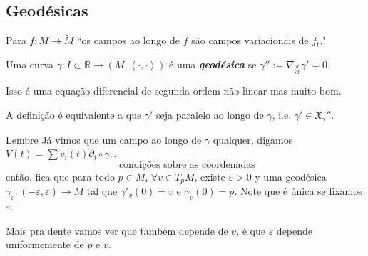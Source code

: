 \subsection{Geodésicas}


\begin{remark}\leavevmode
Para \(f:M \to \tilde{M}\) ``os campos ao longo de \(f\) são campos variacionais de \(f_t\)."
\end{remark}

\begin{defn}\leavevmode
Uma curva \(\gamma:I \subset \mathbb{R} \to (M, \left<\cdot,\cdot\right>)\) é uma \textit{\textbf{geodésica}} se \(\gamma'':=\nabla_{\frac{d}{dt}}\gamma'=0\).
\end{defn}

\begin{remark}\leavevmode
Isso é uma equação diferencial de segunda ordem não linear mas muito bom.
\end{remark}

\begin{remark}\leavevmode
A definição é equivalente a que \(\gamma'\) seja paralelo ao longo de \(\gamma\), i.e. \(\gamma' \in \mathfrak{X}_\gamma''\).
\end{remark}

\begin{thing7}{Lembre}\leavevmode
Já vimos que um campo ao longo de \(\gamma\) qualquer, digamos \(V(t)=\sum v_i(t)\partial_i \circ \gamma\)…
\[\text{ condições sobre as coordenadas} \]
então, fica que para todo \(p \in M\), \(\forall  v \in T_pM\), existe \(\varepsilon>0\) y uma geodésica \(\gamma_v:(-\varepsilon,\varepsilon)\to M\) tal que \(\gamma'_v(0)=v\) e \(\gamma_v(0)=p\). Note que é única se fixamos \(\varepsilon\).

Mais pra dente vamos ver que também depende de \(v\), é que \(\varepsilon\) depende uniformemente de \(p\) e \(v\).

\end{thing7}


